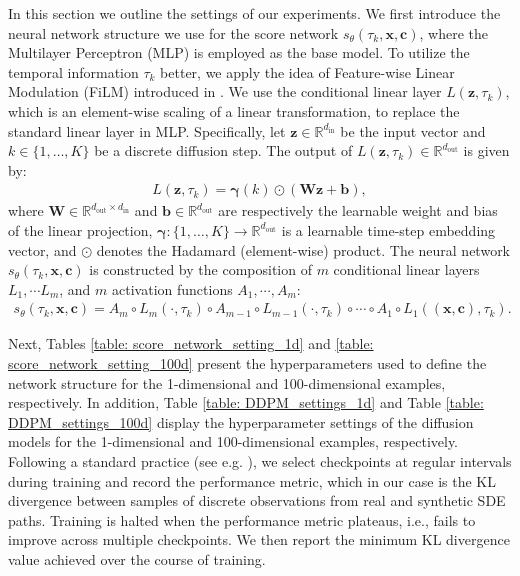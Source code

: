 \documentclass[11pt]{article}
\newcommand{\bx}{\mathbf{x}}
\newcommand{\bz}{\mathbf{z}}
\newcommand{\bc}{\mathbf{c}}
\newcommand{\bW}{\mathbf{W}}
\begin{document}
In this section we outline the settings of our experiments. We first introduce the neural network structure we use for the score network $s_\theta(\tau_k, \bx, \bc)$, where the Multilayer Perceptron (MLP) is employed as the base model. To utilize the temporal information $\tau_k$ better, we apply the idea of Feature-wise Linear Modulation (FiLM) introduced in \cite{perez2018film}. We use the conditional linear layer $L(\bz, \tau_k)$, which is an element-wise scaling of a linear transformation, to replace the standard linear layer in MLP. Specifically, let $\mathbf{z} \in \mathbb{R}^{d_{\text{in}}}$ be the input vector and $k \in \{1, \dots, K\}$ be a discrete diffusion step. The output of $L(\bz, \tau_k)\in \mathbb{R}^{d_{\text{out}}}$ is given by:
\begin{align*}
    L(\bz, \tau_k) = \boldsymbol{\gamma}(k) \odot (\bW\bz + \mathbf{b}),
\end{align*}
where $\bW \in \mathbb{R}^{d_{\text{out}} \times d_{\text{in}}}$ and $\mathbf{b} \in \mathbb{R}^{d_{\text{out}}}$ are respectively the learnable weight and bias of the linear projection, $\boldsymbol{\gamma}:  \{1, \dots, K\}\to \mathbb{R}^{d_{\text{out}}}$ is a learnable time-step embedding vector, and $\odot$ denotes the Hadamard (element-wise) product. The neural network $s_\theta(\tau_k, \bx, \bc)$ is constructed by the composition of $m$ conditional linear layers $L_1, \cdots L_m$, and $m$ activation functions $A_1, \cdots, A_m$:
\begin{align*}
    s_\theta(\tau_k, \bx, \bc) = A_m\circ L_m(\cdot, \tau_k)\circ A_{m - 1}\circ L_{m - 1}(\cdot, \tau_k)\circ \cdots \circ A_1\circ L_1((\bx, \bc), \tau_k).
\end{align*}

Next, Tables \ref{table: score_network_setting_1d} and \ref{table: score_network_setting_100d} present the hyperparameters used to define the network structure for the 1-dimensional and 100-dimensional examples, respectively.
In addition, Table \ref{table: DDPM_settings_1d} and Table \ref{table: DDPM_settings_100d} display the hyperparameter settings of the diffusion models for the 1-dimensional and 100-dimensional examples, respectively.
Following a standard practice (see e.g. \citealt{songscore, ho2021classifier}), we select checkpoints at regular intervals during training and record the performance metric, which in our case is the KL divergence between samples of discrete observations from real and synthetic SDE paths. Training is halted when the performance metric plateaus, i.e., fails to improve across multiple checkpoints. We then report the minimum KL divergence value achieved over the course of training.
\end{document}
